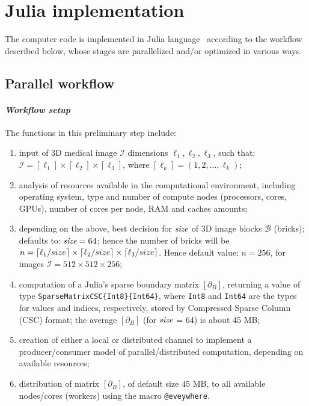\documentclass[11pt, oneside]{amsart}   	%
\begin{document}
%

\section{Julia implementation}\label{sec:julia}

The computer code is implemented in Julia language~\cite{BEKS14} according to the workflow described below, whose stages are parallelized and/or optimized in various ways.

\subsection{Parallel workflow}\label{sec:implementation}


\paragraph{\emph{Workflow setup}}The functions in this preliminary step include:
\begin{enumerate}

\item input of 3D medical image $\mathcal{I}$ dimensions $\ell_1, \ell_2, \ell_3$, such that: $\mathcal{I} = [\ell_1]\times[\ell_2]\times[\ell_3]$, where $[\ell_k] = (1,2,\ldots,\ell_k)$;

\item analysis of resources available in the computational environment, including operating system, type and number of compute nodes (processors, cores, GPUs), number of cores per node, RAM and caches amounts;

\item depending on the above, best decision for $\emph{size}$ of 3D image blocks $\mathcal{B}$ (bricks); defaults to: $\emph{size}=64$; hence the number of bricks will be $n=\left\lceil \ell_1/size \right\rceil\times\left\lceil \ell_2/size \right\rceil\times\left\lceil \ell_3/size \right\rceil$. 
Hence default value: $n=256$, for images $\mathcal{I} = 512\times 512\times 256$;

\item computation of a Julia's sparse boundary matrix $[\partial_B]$, returning a value of type \texttt{SparseMatrixCSC\{Int8\}\{Int64\}}, where \texttt{Int8} and \texttt{Int64} are the types for values and indices, respectively, stored by Compressed Sparse Column (CSC) format; the average $[\partial_B]$ (for $\emph{size}$ = 64) is about 45 MB;

\item creation of either a local or distributed channel to implement a producer/consumer model of parallel/distributed computation, depending on available resources;

\item distribution of matrix $[\partial_B]$, of default size $45$ MB, to all available nodes/cores (workers) using the macro \texttt{@eveywhere}. 

\end{enumerate}
\end{document}
